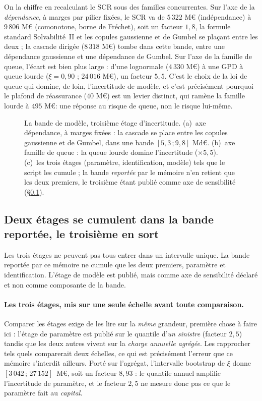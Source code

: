 On la chiffre en recalculant le SCR sous des familles concurrentes. Sur l'axe de la
\emph{dépendance}, à marges par pilier fixées, le SCR va de $5\,322$ M\euro{} (indépendance) à
$9\,806$ M\euro{} (comonotone, borne de Fréchet), soit un facteur $1{,}8$, la formule standard
Solvabilité~II et les copules gaussienne et de Gumbel se plaçant entre les deux ; la cascade
dirigée ($8\,318$ M\euro) tombe dans cette bande, entre une dépendance gaussienne et une
dépendance de Gumbel. Sur l'axe de la famille de queue, l'écart est bien plus large :
d'une lognormale ($4\,330$ M\euro) à une GPD à queue lourde ($\xi=0{,}90$ ; $24\,016$ M\euro),
un facteur $5{,}5$. C'est le choix de la loi de queue qui domine, de loin, l'incertitude de
modèle, et c'est précisément pourquoi le plafond de réassurance ($40$ M\euro) est un levier
distinct, qui ramène la famille lourde à $495$ M\euro : une réponse au risque de queue, non le
risque lui-même.

\begin{figure}[htbp]\centering
{}
\caption{La bande de modèle, troisième étage d'incertitude. (a)~axe dépendance, à
marges fixées : la cascade se place entre les copules gaussienne et de Gumbel, dans une bande
$[5{,}3\,;9{,}8]$ Md\euro. (b)~axe famille de queue : la queue lourde domine
l'incertitude ($\times 5{,}5$). (c)~les trois étages (paramètre, identification,
modèle) tels que le script les cumule ; la bande \emph{reportée} par le mémoire n'en retient que
les deux premiers, le troisième étant publié comme axe de sensibilité
(\S\ref{sec:etage-modele-hors-bande}).}
\label{fig:bande-modele}
\end{figure}

\subsection{Deux étages se cumulent dans la bande reportée, le troisième en sort}
\label{sec:etage-modele-hors-bande}

Les trois étages ne peuvent pas tous entrer dans un intervalle unique. La bande reportée par ce mémoire ne cumule que les deux premiers,
paramètre et identification. L'étage de modèle est publié, mais comme axe de
sensibilité déclaré et non comme composante de la bande.

\paragraph{Les trois étages, mis sur une seule échelle avant toute comparaison.} Comparer les
étages exige de les lire sur la \emph{même} grandeur, première chose à faire ici :
l'étage de paramètre est publié sur le quantile d'\emph{un sinistre} (facteur $2{,}5$) tandis que
les deux autres vivent sur la \emph{charge annuelle agrégée}. Les rapprocher tels quels
comparerait deux échelles, ce qui est précisément l'erreur que ce mémoire s'interdit ailleurs.
Porté sur l'agrégat, l'intervalle bootstrap de $\xi$ donne $[3\,042\,;\,27\,152]$~M\euro, soit un
facteur $8{,}93$ : le quantile annuel amplifie l'incertitude de paramètre, et le facteur
$2{,}5$ ne mesure donc pas ce que le paramètre fait au \emph{capital}.

